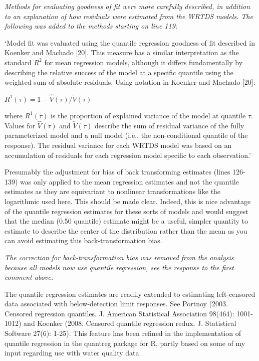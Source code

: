 \documentclass[letterpaper,12pt,oneside]{article}\usepackage[]{graphicx}\usepackage[]{color}
\begin{document}
{\it Methods for evaluating goodness of fit were more carefully described, in addition to an explanation of how residuals were estimated from the WRTDS models.  The following was added to the methods starting on line 119:

`Model fit was evaluated using the quantile regression goodness of fit described in Koenker and Machado [20].  This measure has a similar interpretation as the standard $R^2$ for mean regression models, although it differs fundamentally by describing the relative success of the model at a specific quantile using the weighted sum of absolute residuals. Using notation in Koenker and Machado [20]:
\begin{center}
$R^1\left(\tau\right) = 1 - \hat{V}\left(\tau\right)/\tilde{V}\left(\tau\right)$
\end{center}
\noindent where $R^1\left(\tau\right)$ is the proportion of explained variance of the model at quantile $\tau$.  Values for $\hat{V}\left(\tau\right)$ and $\tilde{V}\left(\tau\right)$ describe the sum of residual variance of the fully parameterized model and a null model (i.e., the non-conditional quantile of the response).  The residual variance for each WRTDS model was based on an accumulation of residuals for each regression model specific to each observation.'}

Presumably the adjustment for bias of back transforming estimates (lines 126-139) was only applied to the mean regression estimates and not the quantile estimates as they are equivariant to nonlinear transformations like the logarithmic used here.  This should be made clear.  Indeed, this is nice advantage of the quantile regression estimates for these sorts of models and would suggest that the median (0.50 quantile) estimate might be a useful, simpler quantity to estimate to describe the center of the distribution rather than the mean as you can avoid estimating this back-transformation bias.

{\it The correction for back-transformation bias was removed from the analysis because all models now use quantile regression, see the response to the first comment above.  
}

The quantile regression estimates are readily extended to estimating left-censored data associated with below-detection limit responses.  See Portnoy (2003.  Censored regression quantiles. J. American Statistical Association 98(464): 1001-1012) and Koenker (2008.  Censored quantile regression redux.  J. Statistical Software 27(6): 1-25).  This feature has been refined in the implementation of quantile regression in the quantreg package for R, partly based on some of my input regarding use with water quality data. 
\end{document}
